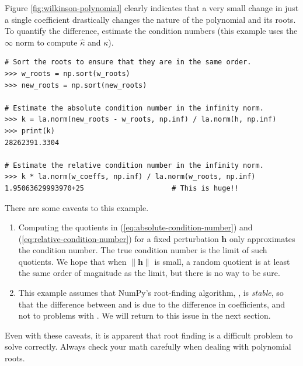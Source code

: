 Figure \ref{fig:wilkinson-polynomial} clearly indicates that a very small change in just a single coefficient drastically changes the nature of the polynomial and its roots.
To quantify the difference, estimate the condition numbers (this example uses the $\infty$ norm to compute $\hat{\kappa}$ and $\kappa$).

\begin{lstlisting}
# Sort the roots to ensure that they are in the same order.
>>> w_roots = np.sort(w_roots)
>>> new_roots = np.sort(new_roots)

# Estimate the absolute condition number in the infinity norm.
>>> k = la.norm(new_roots - w_roots, np.inf) / la.norm(h, np.inf)
>>> print(k)
28262391.3304

# Estimate the relative condition number in the infinity norm.
>>> k * la.norm(w_coeffs, np.inf) / la.norm(w_roots, np.inf)
1.95063629993970+25                     # This is huge!!
\end{lstlisting}

There are some caveats to this example.
\begin{enumerate}
\item Computing the quotients in (\ref{eq:absolute-condition-number}) and (\ref{eq:relative-condition-number}) for a fixed perturbation $\mathbf{h}$ only approximates the condition number.
The true condition number is the limit of such quotients.
We hope that when $\|\mathbf{h}\|$ is small, a random quotient is at least the same order of magnitude as the limit, but there is no way to be sure.

\item This example assumes that NumPy's root-finding algorithm, , is \emph{stable}, so that the difference between  and  is due to the difference in coefficients, and not to problems with .
We will return to this issue in the next section.
\end{enumerate}
Even with these caveats, it is apparent that root finding is a difficult problem to solve correctly.
Always check your math carefully when dealing with polynomial roots.


